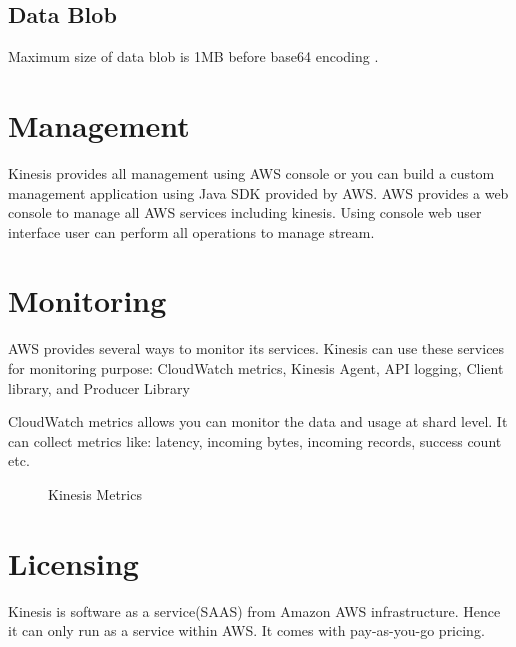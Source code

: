 \documentclass[9pt,twocolumn,twoside]{../../styles/osajnl}
\begin{document}
\subsection{Data Blob}
Maximum size of data blob is 1MB before base64 encoding \cite{www-kinesis-limits}.

\section{Management}
Kinesis provides all management using AWS console or you can build a 
custom management application using Java SDK \cite{www-kinesis-javasdk} 
provided by AWS. AWS provides a  web console to manage all AWS services 
including kinesis.  Using console web user interface user can perform all 
operations to manage stream.

\section{Monitoring}
AWS provides several ways to monitor its services. Kinesis can  use these services
for monitoring purpose:
CloudWatch metrics, Kinesis Agent, API logging, Client library, and Producer Library 

CloudWatch metrics allows you can monitor the data and usage at shard level.  It
can collect metrics like: latency, incoming bytes, incoming records, success count
etc.

\begin{figure}[htbp]
\centering
{}
\caption{Kinesis Metrics\cite{Liston2016amazonkinesis}}
\label{fig:false-color}
\end{figure}

\section{Licensing}
Kinesis is software as a service(SAAS) from Amazon AWS infrastructure. Hence it
can only run as a service within AWS. It comes with pay-as-you-go pricing.
\end{document}
